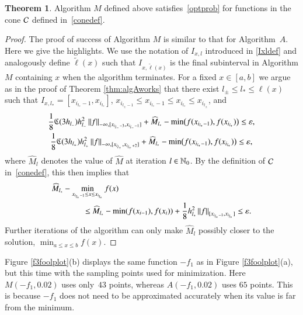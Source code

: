 \documentclass[review]{elsarticle}
\newcommand{\abstol}{\varepsilon}
\theoremstyle{definition}
\newcommand{\tell}{\tilde{\ell}}
\newcommand{\hM}{\widehat{M}}
\newtheorem{theorem}{Theorem}
\newcommand{\minfii}{\min(f(x_{i-1}), f(x_i))} %
\begin{document}
\begin{theorem} \label{thm:algMworks}
Algorithm $M$ defined above satisfies~\eqref{optprob} for functions in the
cone $\mathcal{C}$ defined in~\eqref{conedef}.
\end{theorem}

\begin{proof}
	The proof of success of Algorithm $M$ is similar to that for Algorithm~$A$. Here
	we give the highlights.     We use the notation of $I_{x,l}$ introduced in \eqref{Ixldef}
	and analogously define $\tell(x)$ such that $I_{x,\tell(x)}$ is the final subinterval in
	Algorithm $M$ containing $x$ when the algorithm terminates.   For a fixed $x \in
	[a,b]$ we argue as in the proof of Theorem \ref{thm:algAworks} that there exist
	$l_{\pm} \le l_{*} \le \ell(x)$ such that $I_{x,l_*} =[x_{i_{l_*}-1},x_{i_{l_*}}]$,
	$x_{i_{l_{\pm}-1}} \le x_{i_{l_*}-1} \le x_{i_{l_*}} \le x_{i_{l_{\pm}}}$, and
	\begin{gather*}
	\frac{1} 8 \fC(3h_{l_-}) h_{l_-}^2 \norm[-\infty,{[x_{i_{l_-}-3},x_{i_{l_-}-1}]}]{f} + \hM_{l_*}
	-  \min\bigl(f(x_{i_{l_*}-1}),f(x_{i_{l_*}})\bigr)   \le \abstol , \\
	\frac{1} 8 \fC(3h_{l_+}) h_{l_+}^2 \norm[-\infty,{[x_{i_{l_+}},x_{i_{l_+}+2}]}]{f} +  \hM_{l_*}
	-  \min\bigl(f(x_{i_{l_*}-1}),f(x_{i_{l_*}})\bigr)   \le \abstol,
	\end{gather*}
	where $ \hM_{l}$ denotes the value of $\hM$ at iteration $l \in \mathbb{N}_{0}$.  By the
	definition of $\mathcal{C}$ in~\eqref{conedef}, this then implies that
	\begin{align}
	\nonumber
		\MoveEqLeft[5]{\hM_{l_*} - \min_{x_{i_{l_*}-1} \le x \le x_{i_{l_*}}} f(x) } \nonumber
	\\ \le \ & \hM_{l_*}  - \minfii + \frac{1}{8} h_{l_*}^2\norm[{[x_{i_{l_*}-1}, x_{i_{l_*}}]}]{f} \le
	\abstol. \label{herrtogether}
	\end{align}
Further iterations of the algorithm can only make $\hM_{l}$ possibly closer to the
solution, $\min_{a \le x \le b} f(x) $.
\end{proof}

Figure \ref{f3foolplot}(b) displays the same function $-f_1$ as in
Figure \ref{f3foolplot}(a), but this time with the sampling points used for
minimization. Here $M(-f_1,0.02)$ uses only~$43$ points, whereas
$A(-f_1,0.02)$ uses $65$ points. This is because $-f_1$ does not need to be
approximated accurately when its value is far from the minimum.
\end{document}
